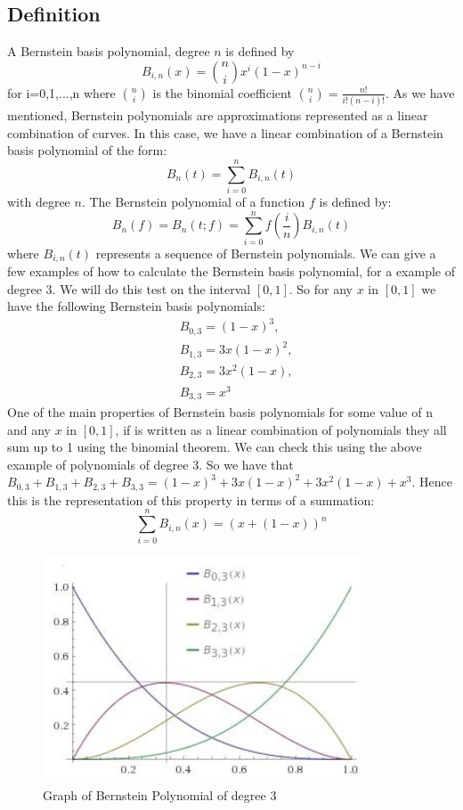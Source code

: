 \documentclass{article}
\begin{document}
\subsection{Definition}
A Bernstein basis polynomial, degree $n$ is defined by
\begin{equation*}
 B_{i,n}(x)=\binom{n}{i}x^i(1-x)^{n-i} 
\end{equation*}
for i=0,1,...,n where $\binom{n}{i}$ is the binomial coefficient $\binom{n}{i}=\frac{n!}{i!(n-i)!}$.
As we have mentioned, Bernstein polynomials are approximations represented as a linear combination of curves. In this case, we have a linear combination of a Bernstein basis polynomial of the form:
\begin{equation*}
B_n(t)=\sum_{i=0}^{n}B_{i,n}(t)
\end{equation*}
with degree $n$. The Bernstein polynomial of a function $f$ is defined by:
\begin{equation*}
B_n(f)=B_n(t;f)=\sum_{i=0}^nf(\frac{i}{n})B_{i,n}(t)   
\end{equation*}
 where $B_{i,n}(t)$ represents a sequence of Bernstein polynomials.
We can give a few examples of how to calculate the Bernstein basis polynomial, for a example of degree $3$. We will do this test on the interval $[0,1]$. So for any $x$ in $[0,1]$ we have the following Bernstein basis polynomials:
\begin{align*}
 &B_{0,3}=(1-x)^3,\\   
&B_{1,3}=3x(1-x)^2,\\
&B_{2,3}=3x^2(1-x),\\
&B_{3,3}=x^3
\end{align*}
One of the main properties of Bernstein basis polynomials for some value of n and any $x$ in $[0,1]$, if is written as a linear combination of polynomials they all sum up to 1 using the binomial theorem. We can check this using the above example of polynomials of degree $3$. So we have that $B_{0,3}+B_{1,3}+B_{2,3}+B_{3,3}=(1-x)^3+3x(1-x)^2+3x^2(1-x)+x^3$.
Hence this is the representation of this property in terms of a summation:
\begin{equation*}
\sum_{i=0}^nB_{i,n}(x)=(x+(1-x))^n    
\end{equation*}
\begin{figure}
    \centering
    \includegraphics[width=95mm]{BP.jpg}
    \caption{Graph of Bernstein Polynomial of degree $3$}
    \label{fig:2}
\end{figure}
\end{document}
